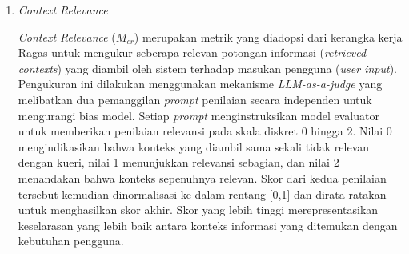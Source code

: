 \begin{enumerate}[label=\alph*., listparindent=\parindent, labelindent=0pt]
\begin{enumerate}[label=\arabic*., listparindent=\parindent, labelindent=0pt]
{\begin{longtblr}[
    caption = {Desain evaluator \textit{faithfulness}},
    label = {tab:faithfulness_evaluator_design},
]
\begin{minipage}{\linewidth}
\begin{enumerate}[label=\arabic*., listparindent=\parindent, labelindent=0pt, nosep, leftmargin=*]
    \end{enumerate}\end{minipage} \\
    Rubrik & \begin{minipage}{\linewidth}\begin{itemize}[nosep, leftmargin=*]
        \item 0.0--0.2 (Tidak Setia): Informasi didominasi fabrikasi; rekomendasi spesifik dikarang tanpa dasar.
        \item 0.3--0.4 (Sebagian Besar Tidak Setia): Banyak klaim spesifik tidak didukung bukti.
        \item 0.5--0.6 (Setia Sebagian): Beberapa klaim kurang dukungan atau spekulasi disajikan sebagai fakta.
        \item 0.7--0.8 (Sebagian Besar Setia): Klaim inti didasarkan bukti, hanya detail minor yang terlewat.
        \item 0.9--1.0 (Sangat Setia): Seluruh klaim spesifik didukung bukti; observasi visual dan saran umum tepat.
    \end{itemize}\end{minipage} \\
\end{longtblr}
}

Skor akhir yang dihasilkan oleh evaluator direpresentasikan dalam nilai kontinu antara 0.0 hingga 1.0, di mana nilai yang lebih tinggi mengindikasikan tingkat kepatuhan fakta yang lebih baik terhadap sumber data.

\item \textit{Context Relevance}

\textit{Context Relevance} ($M_{cr}$) merupakan metrik yang diadopsi dari kerangka kerja Ragas untuk mengukur seberapa relevan potongan informasi (\textit{retrieved contexts}) yang diambil oleh sistem terhadap masukan pengguna (\textit{user input}). Pengukuran ini dilakukan menggunakan mekanisme \textit{LLM-as-a-judge} yang melibatkan dua pemanggilan \textit{prompt} penilaian secara independen untuk mengurangi bias model. Setiap \textit{prompt} menginstruksikan model evaluator untuk memberikan penilaian relevansi pada skala diskret 0 hingga 2. Nilai 0 mengindikasikan bahwa konteks yang diambil sama sekali tidak relevan dengan kueri, nilai 1 menunjukkan relevansi sebagian, dan nilai 2 menandakan bahwa konteks sepenuhnya relevan. Skor dari kedua penilaian tersebut kemudian dinormalisasi ke dalam rentang [0,1] dan dirata-ratakan untuk menghasilkan skor akhir. Skor yang lebih tinggi merepresentasikan keselarasan yang lebih baik antara konteks informasi yang ditemukan dengan kebutuhan pengguna.


\end{enumerate}
\end{enumerate}
